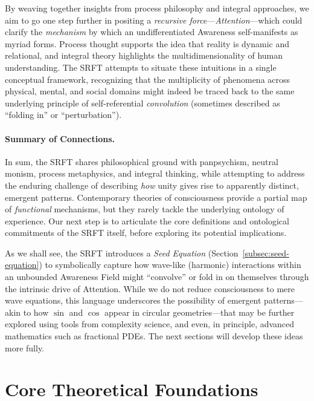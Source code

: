 \documentclass[12pt,a4paper]{article}
\begin{document}
By weaving together insights from process philosophy and integral approaches, we aim to go one step further in positing a \textit{recursive force}---\emph{Attention}---which could clarify the \emph{mechanism} by which an undifferentiated Awareness self-manifests as myriad forms. Process thought supports the idea that reality is dynamic and relational, and integral theory highlights the multidimensionality of human understanding. The SRFT attempts to situate these intuitions in a single conceptual framework, recognizing that the multiplicity of phenomena across physical, mental, and social domains might indeed be traced back to the same underlying principle of self-referential \emph{convolution} (sometimes described as “folding in” or “perturbation”).

\paragraph{Summary of Connections.}
In sum, the SRFT shares philosophical ground with panpsychism, neutral monism, process metaphysics, and integral thinking, while attempting to address the enduring challenge of describing \emph{how} unity gives rise to apparently distinct, emergent patterns. Contemporary theories of consciousness provide a partial map of \emph{functional} mechanisms, but they rarely tackle the underlying ontology of experience. Our next step is to articulate the core definitions and ontological commitments of the SRFT itself, before exploring its potential implications.

\medskip
 
As we shall see, the SRFT introduces a \emph{Seed Equation} (Section~\ref{subsec:seed-equation}) to symbolically capture how wave-like (harmonic) interactions within an unbounded Awareness Field might “convolve” or fold in on themselves through the intrinsic drive of Attention. While we do not reduce consciousness to mere wave equations, this language underscores the possibility of emergent patterns—akin to how $\sin$ and $\cos$ appear in circular geometries—that may be further explored using tools from complexity science, and even, in principle, advanced mathematics such as fractional PDEs. The next sections will develop these ideas more fully.

\section{Core Theoretical Foundations}
\label{sec:core-foundations}
\end{document}
